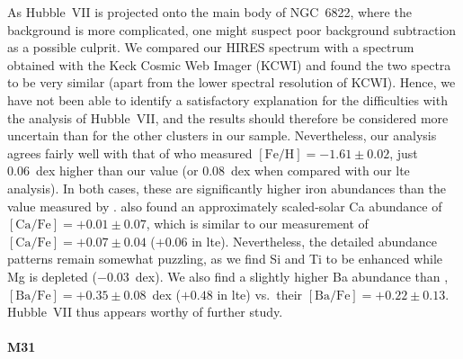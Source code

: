 \documentclass{aa}
\begin{document}
As Hubble~VII is projected onto the main body of NGC~6822, where the background is more complicated, one might suspect poor background subtraction as a possible culprit. We compared our HIRES spectrum with a spectrum obtained with the Keck Cosmic Web Imager (KCWI) and found the two spectra to be very similar (apart from the lower spectral resolution of KCWI). 
Hence, we have not been able to identify a satisfactory explanation for the difficulties with the analysis of Hubble~VII, and the results should therefore be considered more uncertain than for the other clusters in our sample. 
Nevertheless, our analysis agrees fairly well with that of \citet{Colucci2011} who measured $\mathrm{[Fe/H]}=-1.61\pm0.02$, just 0.06~dex higher than our value (or 0.08~dex when compared with our \ac{lte} analysis). In both cases, these are significantly higher iron abundances than the value measured by \citet{Cohen1998}.
\citet{Colucci2011} also found an approximately scaled-solar Ca abundance of $\mathrm{[Ca/Fe]}=+0.01\pm0.07$, which is similar to our measurement of $\mathrm{[Ca/Fe]}=+0.07\pm0.04$ ($+0.06$ in \ac{lte}). Nevertheless, the detailed abundance patterns remain somewhat puzzling, as we find Si and Ti to be enhanced while Mg is depleted ($-0.03$~dex). We also find a slightly higher Ba abundance than \citet{Colucci2011}, $\mathrm{[Ba/Fe]}=+0.35\pm0.08$~dex ($+0.48$ in \ac{lte}) vs.\ their $\mathrm{[Ba/Fe]}=+0.22\pm0.13$. Hubble~VII thus appears worthy of further study. 

\paragraph{M31}
\end{document}
